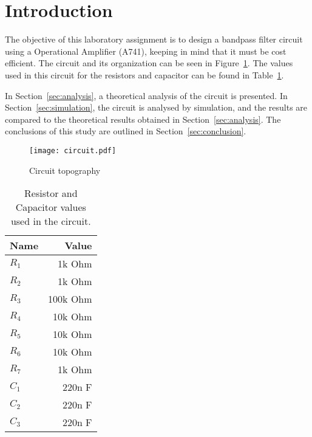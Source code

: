 \section{Introduction}
\label{sec:introduction}

\tab The objective of this laboratory assignment is to design a bandpass filter circuit using a Operational Amplifier (A741), keeping in mind that it must be cost efficient.
The circuit and its organization can be seen in Figure~\ref{fig:circuit}.
The values used in this circuit for the resistors and capacitor can be found in Table~\ref{tab:values}.

In Section~\ref{sec:analysis}, a theoretical analysis of the circuit is
presented. In Section~\ref{sec:simulation}, the circuit is analysed by
simulation, and the results are compared to the theoretical results obtained in
Section~\ref{sec:analysis}. The conclusions of this study are outlined in
Section~\ref{sec:conclusion}.
\\[1cm]
\begin{figure}[h] \centering
\texttt{[image: circuit.pdf]}
\caption{Circuit topography}
\label{fig:circuit}
\end{figure}

\begin{table}[H]
  \centering
  \begin{tabular}{|l|r|}
    \hline    
    {\bf Name} & {\bf Value} \\ \hline
    $R_1$ & 1k Ohm \\ \hline
    $R_2$ & 1k Ohm \\ \hline
    $R_3$ & 100k Ohm \\ \hline
    $R_4$ & 10k Ohm \\ \hline
    $R_5$ & 10k Ohm \\ \hline
    $R_6$ & 10k Ohm \\ \hline	
    $R_7$ & 1k Ohm \\ \hline	
    $C_1$ & 220n F \\ \hline
    $C_2$ & 220n F \\ \hline
    $C_3$ & 220n F \\ \hline	
  \end{tabular}
  \caption{Resistor and Capacitor values used in the circuit.}
  \label{tab:values}
\end{table}
